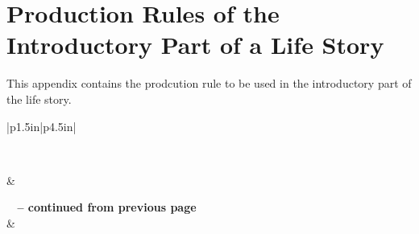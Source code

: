 %
%
%                 

\chapter{Production Rules of the Introductory Part of a Life Story}
\label{sec:appendixk}

This appendix contains the prodcution rule to be used in the introductory part of the life story. 

\begin{longtable}{|p{1.5in}|p{4.5in}|}
\caption{Production Rules of the Introductory Part of a Life Story.} \vspace{0.25em} \\ \hline 

\hline {} &  \\ \hline 
\endfirsthead

{{\bfseries \tablename\ \thetable{} -- continued from previous page}} \\
\hline {} &  \\ \hline 
\endhead

\hline {} \\ \hline
\endfoot

\hline \hline
\endlastfoot


\end{longtable}
